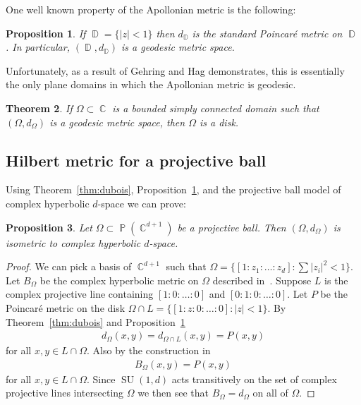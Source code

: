\documentclass[12pt]{amsart}
\theoremstyle{plain}
\newtheorem{proposition}{Proposition}[section]
\newtheorem{theorem}[proposition]{Theorem}
\theoremstyle{definition}
\theoremstyle{remark}
\begin{document}
One well known property of the Apollonian metric is the following:

\begin{proposition}\cite[Lemma 3.1]{B1998}\label{prop:proj_disk}
If $\operatorname{\mathbb{D}} =\{ {\left|{z}\right|} <1\}$ then $d_\operatorname{\mathbb{D}}$ is the standard Poincar\'{e} metric on $\operatorname{\mathbb{D}}$. In particular, $(\operatorname{\mathbb{D}},d_\operatorname{\mathbb{D}})$ is a geodesic metric space.
\end{proposition}

Unfortunately, as a result of Gehring and Hag demonstrates, this is essentially the only plane domains in which the Apollonian metric is geodesic.

\begin{theorem}\cite[Theorem 3.26]{GH2000}\label{thm:not_geod}
If $\Omega \subset \operatorname{\mathbb{C}}$ is a bounded simply connected domain such that $(\Omega, d_{\Omega})$ is a geodesic metric space, then $\Omega$ is a disk.
\end{theorem}

\subsection{Hilbert metric for a projective ball}

Using Theorem~\ref{thm:dubois}, Proposition~\ref{prop:proj_disk}, and the projective ball model of complex hyperbolic $d$-space we can prove:

\begin{proposition}
Let $\Omega \subset \operatorname{\mathbb{P}}(\operatorname{\mathbb{C}}^{d+1})$ be a projective ball. Then $(\Omega, d_{\Omega})$ is isometric to complex hyperbolic $d$-space. 
\end{proposition}

\begin{proof}
We can pick a basis of $\operatorname{\mathbb{C}}^{d+1}$ such that $\Omega = \{ [1:z_1: \dots : z_d] : \sum {\left|{z_i}\right|}^2 < 1 \}$. Let $B_{\Omega}$ be the complex hyperbolic metric on $\Omega$ described in~\cite[Chapter 2, Section 2]{G1999}.  Suppose $L$ is the complex projective line containing $[1:0:\dots:0]$ and $[0:1:0:\dots:0]$. Let $P$ be the Poincar\'{e} metric on the disk $\Omega \cap L=\{ [1:z:0:\dots : 0] : {\left|{z}\right|} < 1\}$. By Theorem~\ref{thm:dubois} and Proposition~\ref{prop:proj_disk} 
\begin{align*}
d_{\Omega}(x,y) = d_{\Omega \cap L}(x,y) = P(x,y)
\end{align*}
for all $x,y \in L \cap \Omega$. Also by the construction in~\cite[Chapter 2, Section 2]{G1999} 
\begin{align*}
B_{\Omega}(x,y) = P(x,y)
\end{align*}
for all $x,y \in L \cap \Omega$. Since $\operatorname{SU}(1,d)$ acts transitively on the set of complex projective lines intersecting $\Omega$ we then see that $B_{\Omega} = d_{\Omega}$ on all of $\Omega$.
\end{proof}
\end{document}

